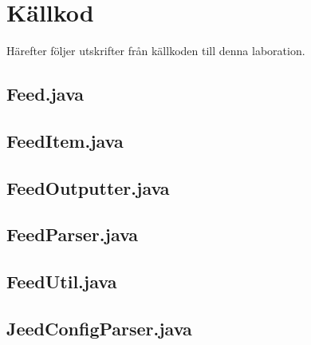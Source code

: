 \documentclass[titlepage, twoside, a4paper, 12pt]{article}
\begin{document}
\section{Källkod}\label{Kallkod}
Härefter följer utskrifter från källkoden till denna laboration.

\subsection{Feed.java}\label{Feed.java}
\begin{footnotesize}
  
\end{footnotesize}

\newpage
\subsection{FeedItem.java}\label{FeedItem.java}
\begin{footnotesize}
  
\end{footnotesize}

\newpage
\subsection{FeedOutputter.java}\label{FeedOutputter.java}
\begin{footnotesize}
  
\end{footnotesize}

\newpage
\subsection{FeedParser.java}\label{FeedParser.java}
\begin{footnotesize}
  
\end{footnotesize}

\newpage
\subsection{FeedUtil.java}\label{FeedUtil.java}
\begin{footnotesize}
  
\end{footnotesize}

\newpage
\subsection{JeedConfigParser.java}\label{JeedConfigParser.java}
\begin{footnotesize}
  
\end{footnotesize}
\end{document}
